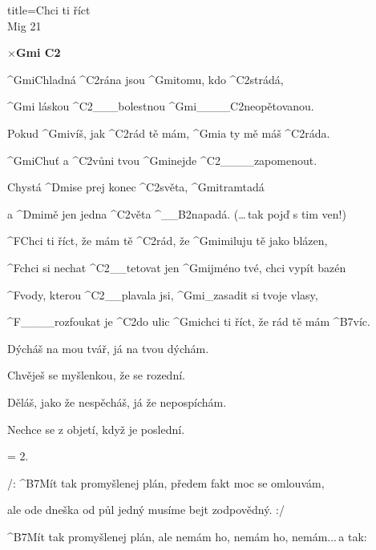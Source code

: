 \begin{song}{title=\predtitle\centering Chci ti říct \\\large Mig 21  \vspace*{-0.3cm}}  %
\begin{centerjustified}


$\times $\textbf{Gmi C2}

\sloka 
	^{Gmi}Chladná ^{C2}rána jsou ^{Gmi}tomu, kdo ^{C2}strádá,

	^{Gmi\,\,}láskou ^{C2{\color{white}\_\_\_}}bolestnou ^{Gmi{\color{white}\_\_\_\_}C2}neopětovanou. 

	Pokud ^{Gmi}víš, jak ^{C2}rád tě mám, ^{Gmi}a ty mě máš ^{C2}ráda. 

	^{Gmi}Chuť a ^{C2}vůni tvou ^{Gmi}nejde ^{C2{\color{white}\_\_\_\_}}zapomenout. 

\sloka
	Chystá ^{Dmi}se prej konec ^{C2}světa, ^{Gmi}tramtadá 
	
	a ^{Dmi}mě jen jedna ^{C2}věta ^{{\color{white}\_\_}B2}napadá. (\dots\,tak pojď s tim ven!) 

	^{F}Chci ti říct, že mám tě ^{C2}rád, že ^{Gmi}miluju tě jako blázen,
	
	^{F}chci si nechat ^{C2{\color{white}\_\_}}tetovat jen ^{Gmi}jméno tvé, chci vypít bazén 
	
	^{F}vody, kterou ^{C2{\color{white}\_\_}}plavala jsi, ^{Gmi{\color{white}\_}}zasadit si tvoje vlasy, 
	
	^{F{\color{white}\_\_\_\_}}rozfoukat je ^{C2}do ulic ^{Gmi}chci ti říct, že rád tě mám ^{B7}víc.

\sloka
	Dýcháš na mou tvář, já na tvou dýchám.

	Chvěješ se myšlenkou, že se rozední.
	
	Děláš, jako že nespěcháš, já že nepospíchám.
	
	Nechce se z objetí, když je poslední.

\sloka  = 2.



\sloka
	/: ^{B7}Mít tak promyšlenej plán, předem fakt moc se omlouvám, 
	
	ale ode dneška od půl jedný musíme bejt zodpovědný. :/

	^{B7}Mít tak promyšlenej plán, ale nemám ho, nemám ho, nemám\elipsa.\elipsa.\elipsa.\,a tak:



\end{centerjustified}
\setcounter{Slokočet}{0}
\end{song}
